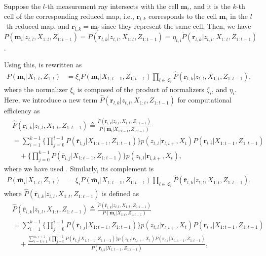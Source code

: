 Suppose the $l$-th measurement ray intersects with the cell $\mathbf{m}_i$, and it is the $k$-th cell of the corresponding reduced map, i.e., $\mathbf{r}_{l,k}$ corresponds to the cell $\mathbf{m}_i$ in the $l$-th reduced map, and $\mathbf{r}_{l,k}=\mathbf{m}_i$ since they represent the same cell.  Then, we have $P(\mathbf{m}_i|z_{t,l},X_{1:t},Z_{1:t-1})=P(\mathbf{r}_{l,k}|z_{t,l},X_{1:t},Z_{1:t-1})=\eta_{t,l}\tilde P(\mathbf{r}_{l,k}|z_{t,l},X_{1:t},Z_{1:t-1})$. 

Using this,  is rewritten as
\begin{align}
P(\mathbf{m}_i|X_{1:t},Z_{1:t})
&=\xi_i P(\mathbf{m}_i|{X_{1:t-1}},Z_{1:t-1})
\prod_{l\in\mathcal L_i}
\hat P(\mathbf{r}_{l,k}|z_{t,l},X_{1:t},Z_{1:t-1})
,
\label{eqn:ISM_Fusion}
\end{align}
where the normalizer $\xi_i$ is composed of the product of normalizers $\zeta_i$, and $\eta_i$. Here, we introduce a new term $\hat P(\mathbf{r}_{l,k}|z_{t,l},X_{1:t},Z_{1:t-1})$ for computational efficiency as
\begin{align}
&\hat P(\mathbf{r}_{l,k}|z_{t,l},X_{1:t},Z_{1:t-1})
\triangleq \frac{\tilde P(\mathbf{r}_{l,k}|z_{t,l},X_{1:t},Z_{1:t-1})}{P(\mathbf{m}_i|X_{1:t-1},Z_{1:t-1})}
\nonumber\\&=
\sum_{i=1}^{k-1}\bigg\{\prod_{j=0}^{i-1}P(\bar{\mathbf{r}}_{l,j}|X_{1:t-1},Z_{1:t-1})\bigg\}p(z_{t,l}|\mathbf{r}_{l,i+},X_t)P(\mathbf{r}_{l,i}|X_{1:t-1},Z_{1:t-1})
\nonumber\\&\quad
+
\bigg\{\prod_{j=0}^{k-1}P(\bar{\mathbf{r}}_{l,j}|X_{1:t-1},Z_{1:t-1})\bigg\}p(z_{t,l}|\mathbf{r}_{l,k+},X_t),
\end{align}
where we have used . Similarly, its complement is
\begin{align}
P(\bar{\mathbf{m}}_i|{{X_{1:t}}},Z_{1:t})
&=\xi_i P(\bar{\mathbf{m}}_i|{X_{1:t-1}},Z_{1:t-1})
\prod_{l\in\mathcal L_i}
\hat P(\bar{\mathbf{r}}_{l,k}|z_{t,l},X_{1:t},Z_{1:t-1})
,
\label{eqn:ISM_Bar_Fusion}
\end{align}
where $\hat P(\bar{\mathbf{r}}_{l,k}|z_{t,l},X_{1:t},Z_{1:t-1})$ is defined as
\begin{align}
&\hat P(\bar{\mathbf{r}}_{l,k}|z_{t,l},X_{1:t},Z_{1:t-1})
\triangleq\frac{\tilde P(\bar{\mathbf{r}}_{l,k}|z_{t,l},X_{1:t},Z_{1:t-1})}{P(\bar{\mathbf{m}}_i|X_{1:t},Z_{1:t-1})}
\nonumber\\
&=\sum_{i=1}^{k-1}\bigg\{\prod_{j=0}^{i-1}P(\bar{\mathbf{r}}_{l,j}|X_{1:t-1},Z_{1:t-1})\bigg\} p(z_{t,l}|\mathbf{r}_{l,i+},X_t)P(\mathbf{r}_{l,i}|X_{1:t-1},Z_{1:t-1})
\nonumber
\\
&\quad
+\frac{
\sum_{i=k+1}^{n_{r,l}+1}\bigg\{\prod_{j=0}^{i-1}P(\bar{\mathbf{r}}_{l,j}|X_{1:t-1},Z_{1:t-1})\bigg\}p(z_{t,l}|\mathbf{r}_{l,i+},X_t)P(\mathbf{r}_{l,i}|X_{1:t-1},Z_{1:t-1})}{P(\bar{\mathbf{r}}_{l,k}|X_{1:t-1},Z_{1:t-1})},
\end{align}
